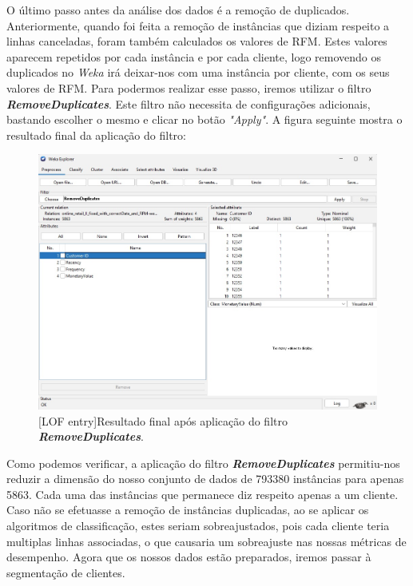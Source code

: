 \documentclass{easychair}
\begin{document}
\vspace{-0.3cm}
O último passo antes da análise dos dados é a remoção de duplicados. Anteriormente, quando foi feita a remoção de instâncias que diziam respeito a linhas canceladas, foram também calculados os valores de RFM. Estes valores aparecem repetidos por cada instância e por cada cliente, logo removendo os duplicados no \textit{Weka} irá deixar-nos com uma instância por cliente, com os seus valores de RFM. Para podermos realizar esse passo, iremos utilizar o filtro \textbf{\textit{RemoveDuplicates}}. Este filtro não necessita de configurações adicionais, bastando escolher o mesmo e clicar no botão \textit{"Apply"}. A figura seguinte mostra o resultado final da aplicação do filtro:

 \begin{figure}[H]
    \begin{centering}
    \includegraphics[width=1\linewidth]{imagens/figure5.jpg}\label{cap-2-fig5}
    [LOF entry]{Resultado final após aplicação do filtro \textit{\textbf{RemoveDuplicates}}.}
    \label{fig5}
    \end{centering}
\end{figure}

Como podemos verificar, a aplicação do filtro \textit{\textbf{RemoveDuplicates}} permitiu-nos reduzir a dimensão do nosso conjunto de dados de 793380 instâncias para apenas 5863. Cada uma das instâncias que permanece diz respeito apenas a um cliente. Caso não se efetuasse a remoção de instâncias duplicadas, ao se aplicar os algoritmos de classificação, estes seriam sobreajustados, pois cada cliente teria multiplas linhas associadas, o que causaria um sobreajuste nas nossas métricas de desempenho.
Agora que os nossos dados estão preparados, iremos passar à segmentação de clientes.
\end{document}
